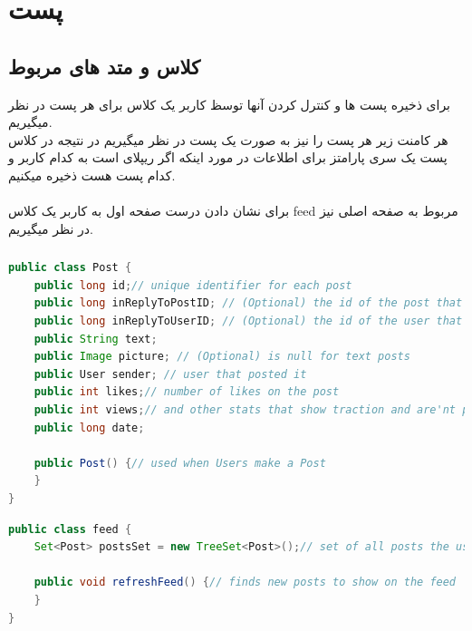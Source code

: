 \documentclass[12pt]{article}
\begin{document}
\section{پست}
\subsection{کلاس و متد های مربوط}
برای ذخیره پست ها و کنترل کردن آنها توسظ کاربر
یک کلاس برای هر پست در نظر میگیریم.\\
هر کامنت زیر هر پست را نیز به صورت یک پست در نظر میگیریم
در نتیجه در کلاس پست یک سری پارامتز برای اطلاعات در مورد اینکه
اگر ریپلای است به کدام کاربر و کدام پست هست ذخیره میکنیم.\\
\\
برای نشان دادن درست صفحه اول به کاربر یک کلاس feed مربوط
به صفحه اصلی نیز در نظر میگیریم.
\begin{latin}
    \subsubsection*{}
    \begin{lstlisting}[language=Java, caption={Post class},label={lst:code}, mathescape=true, breaklines=true]
public class Post {
    public long id;// unique identifier for each post
    public long inReplyToPostID; // (Optional) the id of the post that it was a reply to, null for original posts
    public long inReplyToUserID; // (Optional) the id of the user that it was a reply to, null for original posts
    public String text;
    public Image picture; // (Optional) is null for text posts
    public User sender; // user that posted it
    public int likes;// number of likes on the post
    public int views;// and other stats that show traction and are'nt publicly visible
    public long date;

    public Post() {// used when Users make a Post
    }
}        
    \end{lstlisting}
    \begin{lstlisting}[language=Java, caption={Post class},label={lst:code}, mathescape=true, breaklines=true]
public class feed {
    Set<Post> postsSet = new TreeSet<Post>();// set of all posts the user should see

    public void refreshFeed() {// finds new posts to show on the feed
    }
}     
        \end{lstlisting}
\end{latin}
\end{document}
